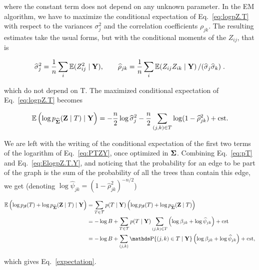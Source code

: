where the constant term does not depend on any unknown parameter. 
In the EM algorithm, we have to maximize the conditional expectation of Eq.~\eqref{eq:logpZ.T} with respect to the variances $\sigma_j^2$ and the correlation coefficients $\rho_{jk}$. The resulting estimates take the usual forms, but with the conditional moments of the $Z_{ij}$, that is
\begin{linenomath*}
\begin{equation} \label{eq:sigma.rho}
\widehat{\sigma}_j^2  = \frac1n \sum_i \operatorname*{\mathbb{E}}(Z^2_{ij}  \mid  {\bf Y}),
\qquad
\widehat{\rho}_{jk}   = \frac1n \sum_i \operatorname*{\mathbb{E}}(Z_{ij} Z_{ik}  \mid  {\bf Y}) \left/ (\widehat{\sigma}_j \widehat{\sigma}_k) \right. .
\end{equation}
\end{linenomath*}
which do not depend on T. 
The maximized conditional expectation of Eq.~\eqref{eq:logpZ.T} becomes
\begin{linenomath*}
\begin{equation} \label{eq:ElogpZ.T.Y}
    \operatorname*{\mathbb{E}}\left(\log p_{\widehat{{\boldsymbol{\Sigma}}}}({\bf Z} \mid T) \mid {\bf Y}\right)
    = - \frac{n}2 \log \widehat{\sigma}_j^2 
    - \frac{n}2 \sum_{(j, k) \in T} \log (1- \widehat{\rho}_{jk}^2)
    + \text{cst}.
\end{equation}
\end{linenomath*}
We are left with the writing of the conditional expectation of the first two terms of the logarithm of Eq.~\eqref{eq:PTZY}, once optimized in ${\boldsymbol{\Sigma}}$. Combining Eq.~\eqref{eq:pT} and Eq.~\eqref{eq:ElogpZ.T.Y}, and noticing that the probability for an edge to be part of the graph is the sum of the probability of all the trees than contain this edge, we get (denoting $\log \widehat{\psi}_{jk} = (1- \widehat{\rho}_{jk}^2)^{-n/2}$)
\begin{linenomath*}
\begin{align*}
    \Esp\left(\log p_\betab (T) + \log p_{\widehat{\Sigmab}}(\Zb \mid T) \mid \Yb\right)
    & = \sum_{T \in \Tcal} p(T \mid \Yb) \left(\log p_\betab(T) + \log p_{\widehat{\Sigmab}}(\Zb \mid T) \right) \\
    & = -\log B + \sum_{T \in \Tcal} p(T \mid \Yb) \sum_{(j, k) \in T} \left(\log \beta_{jk} +\log \widehat{\psi}_{jk} \right) + \text{cst} \\
    & = -\log B + \sum_{(j, k)} \prob\{(j, k) \in T \mid \Yb\} \left(\log \beta_{jk} + \log \widehat{\psi}_{jk} \right) + \text{cst},
\end{align*}
\end{linenomath*}
which gives Eq.~\eqref{expectation}.\\
 
